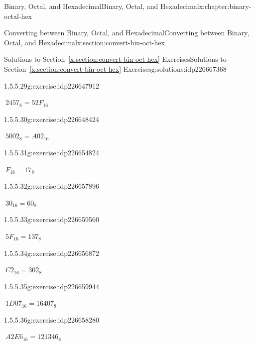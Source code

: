 \documentclass[twoside,10pt,]{book}
\newcommand{\xreffont}{\relax}
\numberwithin{equation}{section}
\begin{document}
\begin{chapterptx}{Binary, Octal, and Hexadecimal}{}{Binary, Octal, and Hexadecimal}{}{}{x:chapter:binary-octal-hex}
\begin{sectionptx}{Converting between Binary, Octal, and Hexadecimal}{}{Converting between Binary, Octal, and Hexadecimal}{}{}{x:section:convert-bin-oct-hex}
\begin{solutions-subsection}{Solutions to Section~{\xreffont\ref*{x:section:convert-bin-oct-hex}} Exercises}{}{Solutions to Section~{\xreffont\ref*{x:section:convert-bin-oct-hex}} Exercises}{}{}{g:solutions:idp226667368}
\begin{exercisegroup}
\begin{divisionsolutioneg}{1.5.5.29}{}{g:exercise:idp226647912}%
\par\smallskip%
\noindent\hypertarget{g:solution:idp226653544-main}{}\(\ 2457_8=52F_{16}\)\end{divisionsolutioneg}%
\begin{divisionsolutioneg}{1.5.5.30}{}{g:exercise:idp226648424}%
\par\smallskip%
\noindent\hypertarget{g:solution:idp226656232-main}{}\(\ 5002_8=A02_{16}\)\end{divisionsolutioneg}%
\end{exercisegroup}
\par\medskip\noindent
\begin{exercisegroup}
\begin{divisionsolutioneg}{1.5.5.31}{}{g:exercise:idp226654824}%
\par\smallskip%
\noindent\hypertarget{g:solution:idp226658920-main}{}\(\ F_{16}=17_8\)\end{divisionsolutioneg}%
\begin{divisionsolutioneg}{1.5.5.32}{}{g:exercise:idp226657896}%
\par\smallskip%
\noindent\hypertarget{g:solution:idp226657128-main}{}\(\ 30_{16}=60_8\)\end{divisionsolutioneg}%
\begin{divisionsolutioneg}{1.5.5.33}{}{g:exercise:idp226659560}%
\par\smallskip%
\noindent\hypertarget{g:solution:idp226662632-main}{}\(\ 5F_{16}=137_8\)\end{divisionsolutioneg}%
\begin{divisionsolutioneg}{1.5.5.34}{}{g:exercise:idp226656872}%
\par\smallskip%
\noindent\hypertarget{g:solution:idp226656104-main}{}\(\ C2_{16}=302_8\)\end{divisionsolutioneg}%
\begin{divisionsolutioneg}{1.5.5.35}{}{g:exercise:idp226659944}%
\par\smallskip%
\noindent\hypertarget{g:solution:idp226660584-main}{}\(\ 1D07_{16}=16407_8\)\end{divisionsolutioneg}%
\begin{divisionsolutioneg}{1.5.5.36}{}{g:exercise:idp226658280}%
\par\smallskip%
\noindent\hypertarget{g:solution:idp226658408-main}{}\(\ A2E6_{16}=121346_8\)\end{divisionsolutioneg}%
\end{exercisegroup}

\end{solutions-subsection}
\end{sectionptx}
\end{chapterptx}
\end{document}
